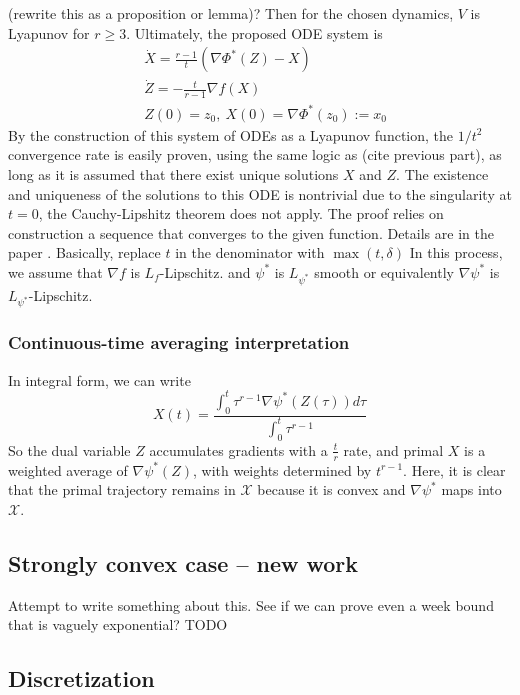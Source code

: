 (rewrite this as a proposition or lemma)?
Then for the chosen dynamics, $V$ is Lyapunov for $r\geq 3$. Ultimately, the proposed ODE system is
\begin{align*}
&\dot X = \frac{r-1}{t} (\nabla \Phi^*(Z) - X)\\
&\dot Z = -\frac{t}{r-1} \nabla f(X)\\
&Z(0) = z_0,~X(0) = \nabla \Phi^*(z_0) := x_0
\end{align*}
By the construction of this system of ODEs as a Lyapunov function, the $1/t^2$ convergence rate is easily proven, using the same logic as (cite previous part), as long as it is assumed that there exist unique solutions $X$ and $Z$. The existence and uniqueness of the solutions to this ODE is nontrivial due to the singularity at $t=0$, the Cauchy-Lipshitz theorem does not apply. The proof relies on construction a sequence that converges to the given function. Details are in the paper \cite{krichene2015accelerated}. Basically, replace $t$ in the denominator with $\max (t,\delta)$ In this process, we assume that $\nabla f$ is $L_f$-Lipschitz. and $\psi^*$ is $L_{\psi^*}$ smooth or equivalently $\nabla \psi^*$ is $L_{\psi^*}$-Lipschitz.

\subsubsection{Continuous-time averaging interpretation}
In integral form, we can write
\[ X(t) = \frac{\int_0^t \tau^{r-1} \nabla\psi^*(Z(\tau)) d\tau}{\int_0^t \tau^{r-1}} \]
So the dual variable $Z$ accumulates gradients with a $\frac{t}{r}$ rate, and primal $X$ is a weighted average of $\nabla\psi^*(Z)$, with weights determined by $t^{r-1}$. Here, it is clear that the primal trajectory remains in $\mathcal X$ because it is convex and $\nabla\psi^*$ maps into $\mathcal X$.

\subsection{Strongly convex case -- new work}
Attempt to write something about this. See if we can prove even a week bound that is vaguely exponential? TODO

\subsection{Discretization}
